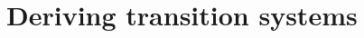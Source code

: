 \documentclass{article}
\begin{document}
            




\section{Deriving transition systems}
\end{document}
